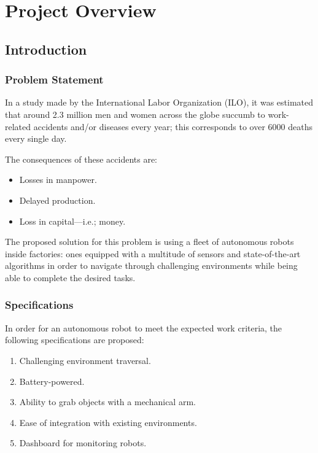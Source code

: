 \setcounter{page}{1}			%
\pagestyle{scrheadings}			%



\part{Project Overview}

\chapter{Introduction}
\label{ch:1}
\section{Problem Statement}
In a study made by the International Labor Organization (ILO), it was estimated that around 2.3 million men and women across the globe succumb to work-related accidents and/or diseases every year; this corresponds to over 6000 deaths every single day. 

The consequences of these accidents are:
\begin{itemize}
	\item Losses in manpower.
	\item Delayed production.
	\item Loss in capital---i.e.; money.
\end{itemize}

The proposed solution for this problem is using a fleet of autonomous robots inside factories: ones equipped with a multitude of sensors and state-of-the-art algorithms in order to navigate through challenging environments while being able to complete the desired tasks.

\section{Specifications}
In order for an autonomous robot to meet the expected work criteria, the following specifications are proposed:
\begin{enumerate}
	\item Challenging environment traversal.
	\item Battery-powered.
	\item Ability to grab objects with a mechanical arm.
    \item Ease of integration with existing environments.
    \item Dashboard for monitoring robots.
\end{enumerate}

